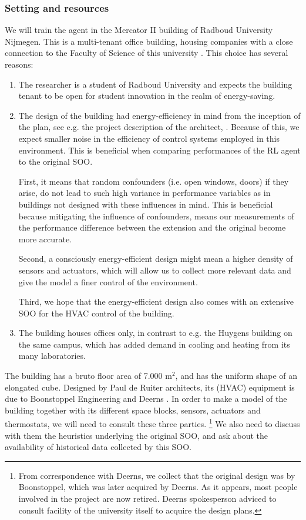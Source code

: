 \documentclass{article}
\theoremstyle{definition}
\theoremstyle{remark}
\begin{document}
\subsubsection{Setting and resources}\label{Method:setup}
We will train the agent in the Mercator II building of Radboud University Nijmegen. This is a multi-tenant office building, housing companies with a close connection to the Faculty of Science of this university \cite{MercatorSciencePark_2023}. This choice has several reasons:

\begin{enumerate}
    \item The researcher is a student of Radboud University and expects the building tenant to be open for student innovation in the realm of energy-saving. 
    
    \item The design of the building had energy-efficiency in mind from the inception of the plan, see e.g. the project description of the architect, \cite{PauldeRuiter_2023}. Because of this, we expect smaller noise in the efficiency of control systems employed in this environment. This is beneficial when comparing performances of the RL agent to the original SOO.
    
    First, it means that random confounders (i.e. open windows, doors) if they arise, do not lead to such high variance in performance variables as in buildings not designed with these influences in mind. 
    This is beneficial because mitigating the influence of confounders, means our measurements of the performance difference between the extension and the original become more accurate. 
    
    Second, a consciously energy-efficient design might mean a higher density of sensors and actuators, which will allow us to collect more relevant data and give the model a finer control of the environment.

    Third, we hope that the energy-efficient design also comes with an extensive SOO for the HVAC control of the building.
    
    \item The building houses offices only, in contrast to e.g. the Huygens building on the same campus, which has added demand in cooling and heating from its many laboratories.
\end{enumerate}

The building has a bruto floor area of 7.000 m$^2$, and has the uniform shape of an elongated cube. Designed by Paul de Ruiter architects, its (HVAC) equipment is due to Boonstoppel Engineering and Deerns \cite{PauldeRuiter_2023}. In order to make a model of the building together with its different space blocks, sensors, actuators and thermostats, we will need to consult these three parties. \footnote{From correspondence with Deerns, we collect that the original design was by Boonstoppel, which was later acquired by Deerns. As it appears, most people involved in the project are now retired. Deerns spokesperson adviced to consult facility of the university itself to acquire the design plans.} We also need to discuss with them the heuristics underlying the original SOO, and ask about the availability of historical data collected by this SOO.
\end{document}
